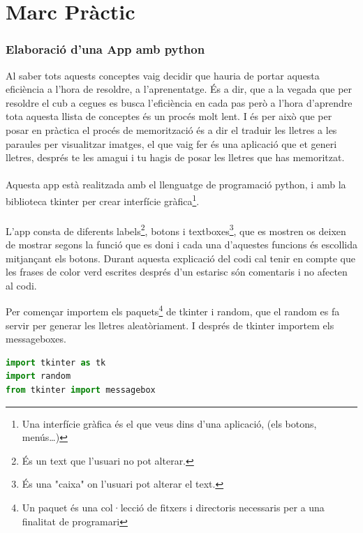 \part*{Marc Pràctic}

\section{Elaboració d'una App amb python}

Al saber tots aquests conceptes vaig decidir que hauria de portar aquesta eficiència a l'hora de resoldre, a l'aprenentatge. És a dir, que a la vegada que per resoldre el cub a cegues es busca l'eficiència en cada pas però a l'hora d'aprendre tota aquesta llista de conceptes és un procés molt lent.
I és per això que per posar en pràctica el procés de memorització és a dir el traduir les lletres a les paraules per visualitzar imatges, el que vaig fer és una aplicació que et generi lletres, després te les amagui i tu hagis de posar les lletres que has memoritzat.
\\\\Aquesta app està realitzada amb el llenguatge de programació python, i amb la biblioteca tkinter per crear interfície gràfica\footnote{Una interfície gràfica és el que veus dins d'una aplicació, (els botons, menús\dots)}.
\\\\L'app consta de diferents labels\footnote{És un text que l'usuari no pot alterar.}, botons i textboxes\footnote{És una "caixa" on l'usuari pot alterar el text.}, que es mostren os deixen de mostrar segons la funció que es doni i cada una d'aquestes funcions és escollida mitjançant els botons. Durant aquesta explicació del codi cal tenir en compte que les frases de color verd escrites després d'un estarisc són comentaris i no afecten al codi.

\vspace{0.5cm}

Per començar importem els paquets\footnote{Un paquet és una col·lecció de fitxers i directoris necessaris per a una finalitat de programari} de tkinter i random, que el random es fa servir per generar les lletres aleatòriament. I després de tkinter importem els messageboxes.

\begin{lstlisting}[language=Python, style=colorEX, caption=Importació de paquets]
import tkinter as tk
import random
from tkinter import messagebox
\end{lstlisting}

